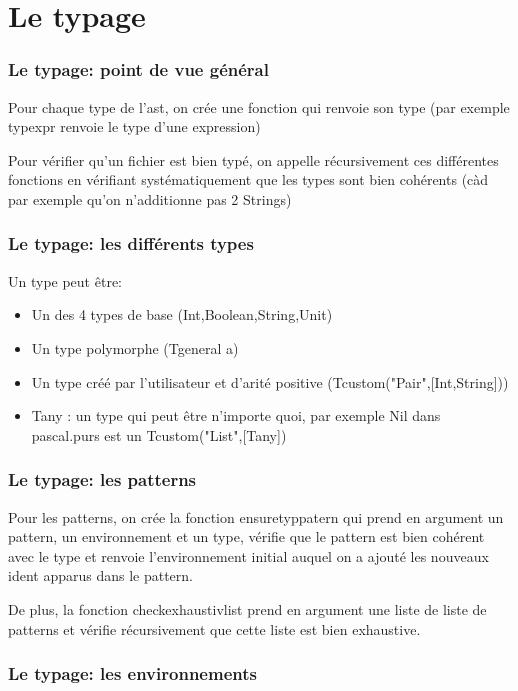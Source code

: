 \documentclass[12pt,a4paper,french]{article}
\begin{document}
\newpage
\part*{Le typage}
\section*{Le typage: point de vue général}

Pour chaque type de l'ast, on crée une fonction qui renvoie son type (par exemple typexpr renvoie le type d'une expression)

Pour vérifier qu'un fichier est bien typé, on appelle récursivement ces différentes fonctions en vérifiant systématiquement
que les types sont bien cohérents (càd par exemple qu'on n'additionne pas 2 Strings)


\section*{Le typage: les différents types}

\noindent Un type peut être:

\begin{itemize}
	\item Un des 4 types de base (Int,Boolean,String,Unit)
	\item Un type polymorphe (Tgeneral a)
	\item Un type créé par l'utilisateur et d'arité positive (Tcustom("Pair",[Int,String]))
	\item Tany : un type qui peut être n'importe quoi, par exemple Nil dans pascal.purs est un Tcustom("List",[Tany])
\end{itemize}


\section*{Le typage: les patterns}

Pour les patterns, on crée la fonction ensuretyppatern qui prend en argument un pattern, un environnement et un type, vérifie
que le pattern est bien cohérent avec le type et renvoie l'environnement initial auquel on a ajouté les nouveaux ident apparus dans le pattern.

De plus, la fonction checkexhaustivlist prend en argument une liste de liste de patterns et vérifie récursivement que cette liste est bien exhaustive.


\section*{Le typage: les environnements}
\end{document}
